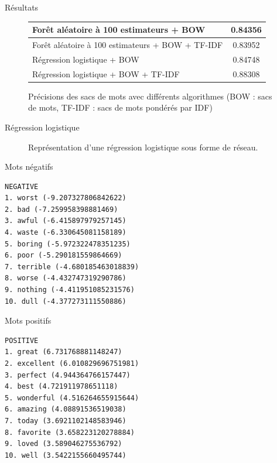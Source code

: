 \documentclass{beamer}
\begin{document}
\begin{frame}{Résultats}
\begin{figure}
\begin{center}
\begin{tabular}{|l|c|}
	\hline
	Forêt aléatoire à 100 estimateurs + BOW & 0.84356 \\
	\hline
	Forêt aléatoire à 100 estimateurs + BOW + TF-IDF & 0.83952 \\
	\hline
	Régression logistique + BOW & 0.84748 \\
	\hline
	Régression logistique + BOW + TF-IDF & 0.88308 \\
	\hline
\end{tabular}
\caption{Précisions des sacs de mots avec différents algorithmes (BOW : sacs de mots, TF-IDF : sacs de mots pondérés par IDF)}
\end{center}
\end{figure}
\end{frame}

\begin{frame}{Régression logistique}
\begin{figure}
\begin{center}

\end{center}
\caption{Représentation d'une régression logistique sous forme de réseau.}
\end{figure}
\end{frame}

\begin{frame}[containsverbatim]{Mots négatifs}
\begin{verbatim}
NEGATIVE
1. worst (-9.207327806842622)
2. bad (-7.259958398881469)
3. awful (-6.415897979257145)
4. waste (-6.330645081158189)
5. boring (-5.972322478351235)
6. poor (-5.290181559864669)
7. terrible (-4.680185463018839)
8. worse (-4.432747319290786)
9. nothing (-4.411951085231576)
10. dull (-4.377273111550886)
\end{verbatim}
\end{frame}

\begin{frame}[containsverbatim]{Mots positifs}
\begin{verbatim}
POSITIVE
1. great (6.731768881148247)
2. excellent (6.010829696751981)
3. perfect (4.944364766157447)
4. best (4.721911978651118)
5. wonderful (4.516264655915644)
6. amazing (4.08891536519038)
7. today (3.6921102148583946)
8. favorite (3.658223120278884)
9. loved (3.589046275536792)
10. well (3.5422155660495744)
\end{verbatim}
\end{frame}
\end{document}
